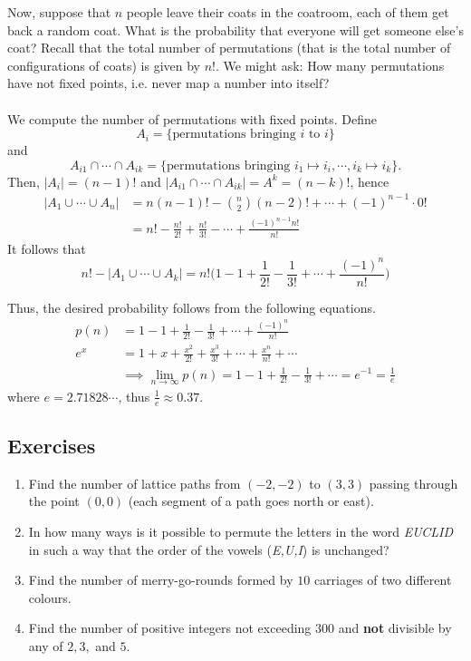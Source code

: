 Now, suppose that $n$ people leave their coats in the coatroom, each of them get back a random coat. 
What is the probability that everyone will get someone else's coat? Recall that the total number of permutations 
(that is the total number of configurations of coats) is given by $n!$. We might ask: How many permutations have 
not fixed points, i.e. never map a number into itself?\\
\\
We compute the number of permutations with fixed points. Define 
$$
A_i=\{\text{permutations  bringing }i \text{ to } i\}
$$ 
and 
$$
A_{i1} \cap \cdots \cap A_{ik}=\{\text{permutations bringing } i_1 \mapsto i_i, \cdots, i_k \mapsto i_k\}.
$$
Then, $|A_i|=(n-1)!$ and $|A_{i1} \cap \cdots \cap A_{ik}|=A^k=(n-k)!$, hence
\begin{align*}
|A_1 \cup \cdots \cup A_n|&=n(n-1)!- {n \choose 2} (n-2)! + \cdots + (-1)^{n-1} \cdot 0!\\
&=
n! - \frac{n!}{2!}+ \frac{n!}{3!} - \cdots + \frac{(-1)^{n-1}n!}{n!}
\end{align*}
It follows that
$$
n! - |A_1 \cup \cdots \cup A_k|=n!\biggr(1-1 + \frac{1}{2!}- \frac{1}{3!}+ \cdots + \frac{(-1)^n}{n!}\biggl)
$$

Thus, the desired probability follows from the following equations.
\begin{align*}
p(n)&=1-1+\frac{1}{2!}-\frac{1}{3!}+\cdots + \frac{(-1)^n}{n!}\\
e^x&=1+x+\frac{x^2}{2!}+\frac{x^3}{3!}+ \cdots + \frac{x^n}{n!} + \cdots\\
&\implies \lim_{n \to \infty} p(n)=1-1+\frac{1}{2!}-\frac{1}{3!}+ \cdots = e^{-1}=\frac{1}{e}
\end{align*}
where $e=2.71828 \cdots$, thus $\frac{1}{e} \approx 0.37$.
\subsection{Exercises}

\begin{enumerate}
    \item Find the number of lattice paths from $(-2, -2)$ to $(3,3)$ passing through the point $(0,0)$ (each segment of a path goes north or east).
    \item In how many ways is it possible to permute the letters in the word \textit{EUCLID} in such a way that the order of the vowels (\textit{E,U,I}) is unchanged?
    \item Find the number of merry-go-rounds formed by $10$ carriages of two different colours.
    \item Find the number of positive integers not exceeding $300$ and \textbf{not} divisible by any of $2,3,$ and $5$.
\end{enumerate}